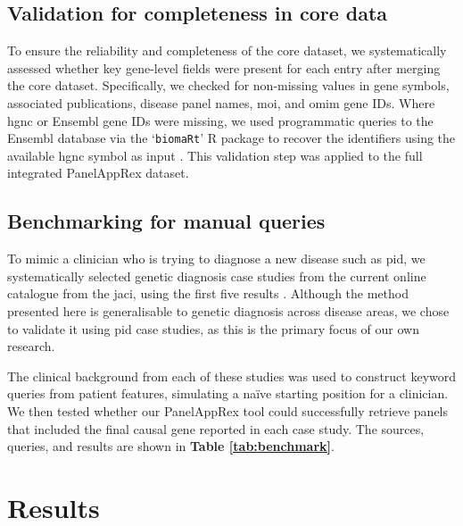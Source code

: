\subsection{Validation for completeness in core data}
\noindent
To ensure the reliability and completeness of the core dataset, we systematically assessed whether key gene-level fields were present for each entry after merging the core dataset.
Specifically, we checked for non-missing values in gene symbols, associated publications, disease panel names, \ac{moi}, and \ac{omim} gene IDs. 
Where \ac{hgnc} or Ensembl gene IDs were missing, we used programmatic queries to the Ensembl database via the `\texttt{biomaRt}' R package to recover the identifiers using the available \ac{hgnc} symbol as input \cite{steffen_durinck_biomart}. 
This validation step was applied to the full integrated PanelAppRex dataset.

\subsection{Benchmarking for manual queries}
\noindent
To mimic a clinician who is trying to diagnose a new disease such as \ac{pid}, we systematically selected genetic diagnosis case studies from the current online catalogue from the \ac{jaci}, using the first five results  \cite{arruda_genetic_2015, 
mcaleer_severe_2015,
verhoeven_hematopoietic_2022,
magerus-chatinet_autoimmune_2013,
sharfe_fatal_2014}. 
Although the method presented here is generalisable to genetic diagnosis across disease areas, we chose to validate it using \ac{pid} case studies, as this is the primary focus of our own research.

The clinical background from each of these studies was used to construct keyword queries from patient features, simulating a naïve starting position for a clinician.
We then tested whether our PanelAppRex tool could successfully retrieve panels that included the final causal gene reported in each case study. 
The sources, queries, and results are shown in \textbf{Table \ref{tab:benchmark}}. 

\section{Results}
\noindent
